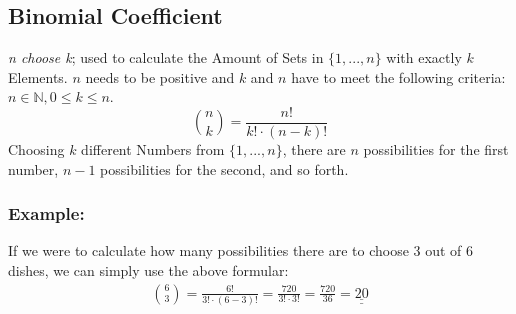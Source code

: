 \documentclass[twoside, a4paper, twocolumn]{article}
\begin{document}
    \subsection{Binomial Coefficient}
    \textit{n choose k}; used to calculate the Amount of Sets in
    $\{1,\textrm{...},n\}$ with exactly $k$ Elements. $n$ needs to be positive
    and $k$ and $n$ have to meet the following criteria: $n \in \mathbb{N}, 0
    \leq k \leq n$.
    \begin{equation}
        \binom{n}{k} = \frac{n!}{k! \cdot (n-k)!}
    \end{equation}
    Choosing $k$ different Numbers from $\{1,\textrm{...},n\}$, there are $n$
    possibilities for the first number, $n-1$ possibilities for the second, and
    so forth. 

    \subsubsection{Example:}
    If we were to calculate how many possibilities there are to choose 3 out of
    6 dishes, we can simply use the above formular:
    \begin{align*}
        \binom{6}{3} = \frac{6!}{3! \cdot (6-3)!} = \frac{720}{3! \cdot 3!} =
        \frac{720}{36} = \underline{\underline{20}}
    \end{align*}

\end{document}
